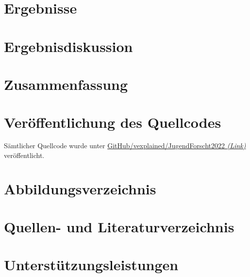 \documentclass[11pt, a4paper]{article}
\begin{document}
\section{Ergebnisse}


\section{Ergebnisdiskussion}


\section{Zusammenfassung}


\section{Veröffentlichung des Quellcodes}

\noindent
Sämtlicher Quellcode wurde unter \href{https://github.com/vexplained/JugendForscht2022/tree/main/programming/}{GitHub/vexplained/JugendForscht2022 \emph{(Link)}} veröffentlicht.

\newpage

\section{Abbildungsverzeichnis}
\listoffigures

\section{Quellen- und Literaturverzeichnis}

\printbibliography

\newpage

\section{Unterstützungsleistungen}

\end{document}
